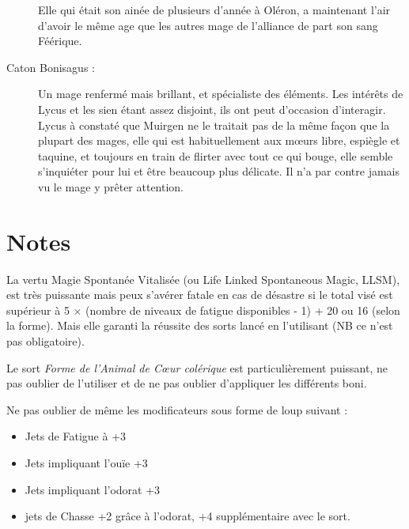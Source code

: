\begin{description}
Elle qui était son ainée de plusieurs d'année à Oléron, a maintenant l'air d'avoir le même age que les autres mage de l'alliance de part son sang Féérique.
\item[Caton Bonisagus :] Un mage renfermé mais brillant, et spécialiste des éléments. Les intérêts de Lycus et les sien étant assez disjoint, ils ont peut d'occasion d'interagir. Lycus à constaté que Muirgen ne le traitait pas de la même façon que la plupart des mages, elle qui est habituellement aux mœurs libre, espiègle et taquine, et toujours en train de flirter avec tout ce qui bouge, elle semble s'inquiéter pour lui et être beaucoup plus délicate. Il n'a par contre jamais vu le mage y prêter attention.
\end{description}

\section*{Notes}
La vertu Magie Spontanée Vitalisée (ou Life Linked Spontaneous Magic, LLSM), est très puissante mais peux s'avérer fatale en cas de désastre si le total visé est supérieur à 5 $\times$ (nombre de niveaux de fatigue disponibles - 1) + 20 ou 16 (selon la forme). Mais elle garanti la réussite des sorts lancé en l'utilisant (NB ce n'est pas obligatoire).

Le sort \emph{Forme de l'Animal de Cœur colérique} est particulièrement puissant, ne pas oublier de l'utiliser et de ne pas oublier d'appliquer les différents boni.

Ne pas oublier de même les modificateurs sous forme de loup suivant :
\begin{itemize}
\item Jets de Fatigue à +3
\item Jets impliquant l'ouïe +3
\item Jets impliquant l'odorat +3
\item jets de Chasse +2 grâce à l'odorat, +4 supplémentaire avec le sort.
\end{itemize}

\pagebreak

